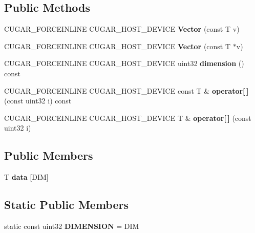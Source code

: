 \subsection*{Public Methods}
\begin{DoxyCompactItemize}
\item 
\mbox{\label{structcugar_1_1_vector_a2d0e823a2bf6fbab576f0a9233e99b1a}} 
C\+U\+G\+A\+R\+\_\+\+F\+O\+R\+C\+E\+I\+N\+L\+I\+NE C\+U\+G\+A\+R\+\_\+\+H\+O\+S\+T\+\_\+\+D\+E\+V\+I\+CE {\bfseries Vector} (const T v)
\item 
\mbox{\label{structcugar_1_1_vector_a7729cdea03a52d3977c7d5ff4d17c372}} 
C\+U\+G\+A\+R\+\_\+\+F\+O\+R\+C\+E\+I\+N\+L\+I\+NE C\+U\+G\+A\+R\+\_\+\+H\+O\+S\+T\+\_\+\+D\+E\+V\+I\+CE {\bfseries Vector} (const T $\ast$v)
\item 
\mbox{\label{structcugar_1_1_vector_acb059db68971655ed320dac783bec84f}} 
C\+U\+G\+A\+R\+\_\+\+F\+O\+R\+C\+E\+I\+N\+L\+I\+NE C\+U\+G\+A\+R\+\_\+\+H\+O\+S\+T\+\_\+\+D\+E\+V\+I\+CE uint32 {\bfseries dimension} () const
\item 
\mbox{\label{structcugar_1_1_vector_a24dd563ee810b7db3260e6944d2e7141}} 
C\+U\+G\+A\+R\+\_\+\+F\+O\+R\+C\+E\+I\+N\+L\+I\+NE C\+U\+G\+A\+R\+\_\+\+H\+O\+S\+T\+\_\+\+D\+E\+V\+I\+CE const T \& {\bfseries operator\mbox{[}$\,$\mbox{]}} (const uint32 i) const
\item 
\mbox{\label{structcugar_1_1_vector_a5142ca6c0333258a2ef6f9de91d003a3}} 
C\+U\+G\+A\+R\+\_\+\+F\+O\+R\+C\+E\+I\+N\+L\+I\+NE C\+U\+G\+A\+R\+\_\+\+H\+O\+S\+T\+\_\+\+D\+E\+V\+I\+CE T \& {\bfseries operator\mbox{[}$\,$\mbox{]}} (const uint32 i)
\end{DoxyCompactItemize}
\subsection*{Public Members}
\begin{DoxyCompactItemize}
\item 
\mbox{\label{structcugar_1_1_vector_a4c7e6d36b6f7d44960e2e492af652aa4}} 
T {\bfseries data} \mbox{[}D\+IM\mbox{]}
\end{DoxyCompactItemize}
\subsection*{Static Public Members}
\begin{DoxyCompactItemize}
\item 
\mbox{\label{structcugar_1_1_vector_abaa5a26d683c23c92a1582bb5cb60e9e}} 
static const uint32 {\bfseries D\+I\+M\+E\+N\+S\+I\+ON} = D\+IM
\end{DoxyCompactItemize}
